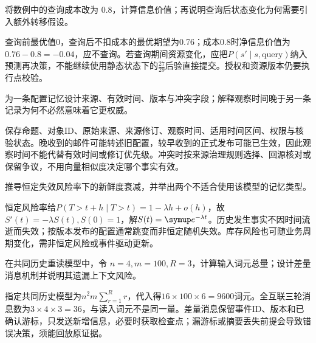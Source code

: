 \begin{exercises}
\begin{exercise}\optional 将数例中的查询成本改为 $0.8$，计算信息价值；再说明查询后状态变化为何需要引入额外转移假设。

\begin{solution}
查询前最优值0，查询后不扣成本的最优期望为0.76；成本0.8时净信息价值为$0.76-0.8=-0.04$，应不查询。若查询期间资源变化，应把$P(s'\mid s,\text{query})$纳入预测再决策，不能继续使用静态状态下的$\frac{27}{29}$后验直接提交。授权和资源版本仍要执行点校验。
\end{solution}
\end{exercise}

\begin{exercise} 为一条配置记忆设计来源、有效时间、版本与冲突字段；解释观察时间晚于另一条记录为何不必然意味着它更权威。

\begin{solution}
保存命题、对象ID、原始来源、来源修订、观察时间、适用时间区间、权限与核验状态。晚收到的邮件可能转述旧配置，较早收到的正式发布可能已生效，因此观察时间不能代替有效时间或修订优先级。冲突时按来源治理规则选择、回源核对或保留争议，不用向量相似度决定哪个事实有效。
\end{solution}
\end{exercise}

\begin{exercise}\optional 推导恒定失效风险率下的新鲜度衰减，并举出两个不适合使用该模型的记忆类型。

\begin{solution}
恒定风险率给$P(T>t+h\mid T>t)=1-\lambda h+o(h)$，故$S'(t)=-\lambda S(t),S(0)=1$，解$S(t)=\conste{}^{-\lambda t}$。历史发生事实不因时间流逝而失效；按版本发布的配置通常跳变而非恒定随机失效。库存风险也可随业务周期变化，需非恒定风险或事件驱动更新。
\end{solution}
\end{exercise}

\begin{exercise}\optional 在共同历史重读模型中，令 $n=4,m=100,R=3$，计算输入词元总量；设计差量消息机制并说明其遗漏上下文风险。

\begin{solution}
指定共同历史模型为$n^2m\sum_{r=1}^Rr$，代入得$16\times100\times6=9600$词元。全互联三轮消息数为$3\times4\times3=36$，与读入词元不是同一量。差量消息保留事件ID、版本和已确认游标，只发送新增信息，必要时获取检查点；漏游标或摘要丢失前提会导致错误决策，须能回放原证据。
\end{solution}
\end{exercise}


\end{exercises}
